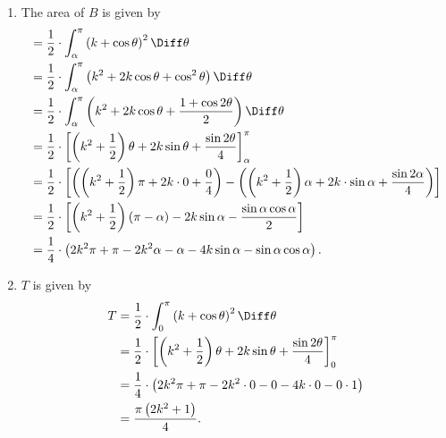\begin{enumerate}
    \item The area of \(B\) is given by
          \begin{align*}
              [B] & = \frac{1}{2} \cdot \int_{\alpha}^{\pi} \left(k + \cos \theta\right)^2 \Diff \theta                                                                                                                            \\
                  & = \frac{1}{2} \cdot \int_{\alpha}^{\pi} \left(k^2 + 2k \cos \theta + \cos^2 \theta\right) \Diff \theta                                                                                                         \\
                  & = \frac{1}{2} \cdot \int_{\alpha}^{\pi} \left(k^2 + 2k \cos \theta + \frac{1 + \cos 2\theta}{2}\right) \Diff \theta                                                                                            \\
                  & = \frac{1}{2} \cdot \left[\left(k^2 + \frac{1}{2}\right)\theta + 2k \sin \theta + \frac{\sin 2\theta}{4}\right]_{\alpha}^{\pi}                                                                                 \\
                  & = \frac{1}{2} \cdot \left[\left(\left(k^2 + \frac{1}{2}\right)\pi + 2k \cdot 0 + \frac{0}{4}\right) - \left(\left(k^2 + \frac{1}{2}\right)\alpha + 2k \cdot \sin \alpha + \frac{\sin 2\alpha}{4}\right)\right] \\
                  & = \frac{1}{2} \cdot \left[\left(k^2 + \frac{1}{2}\right) \left(\pi - \alpha\right) - 2k \sin \alpha - \frac{\sin \alpha \cos \alpha}{2}\right]                                                                 \\
                  & = \frac{1}{4} \cdot \left(2k^2 \pi + \pi - 2k^2 \alpha - \alpha - 4k \sin \alpha - \sin \alpha \cos \alpha\right).
          \end{align*}

    \item \(T\) is given by
          \begin{align*}
              T & = \frac{1}{2} \cdot \int_{0}^{\pi} \left(k + \cos \theta\right)^2 \Diff \theta                                            \\
                & = \frac{1}{2} \cdot \left[\left(k^2 + \frac{1}{2}\right)\theta + 2k \sin \theta + \frac{\sin 2\theta}{4}\right]_{0}^{\pi} \\
                & = \frac{1}{4} \cdot \left(2k^2 \pi + \pi - 2k^2 \cdot 0 - 0 - 4k \cdot 0 - 0 \cdot 1\right)                               \\
                & = \frac{\pi \left(2k^2 + 1\right)}{4}.
          \end{align*}


\end{enumerate}
